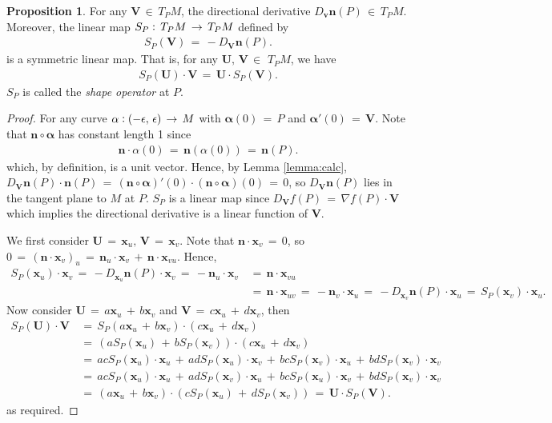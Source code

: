 \documentclass{UKZNcomp}
\newcommand{\vect}[1]{\mathbf{#1}} %
\theoremstyle{definition}
\newtheorem{prop}[definition]{Proposition}
\theoremstyle{remark}
\begin{document}
\begin{prop}
For any $ \vect{V}\,\in\,T_PM $, the directional derivative $D_{\vect{v}}\vect{n}(P)\,\in\,T_PM$. Moreover, the linear map $S_P\vcentcolon\,T_PM\,\to\,T_PM$ defined by
\begin{align*}
S_P(\vect{V})\,=\,-D_{\vect{V}}\vect{n}(P).
\end{align*}
is a symmetric linear map. That is, for any $\vect{U},\,\vect{V}\,\in\,\,T_PM$, we have
\begin{align*}
S_P(\vect{U})\cdot\vect{V}\,=\,\vect{U}\cdot S_P(\vect{V}).
\end{align*}
$S_P$ is called the \textit{shape operator} at $P$.
\end{prop}

\begin{proof}
For any curve $\vect{\alpha}\vcentcolon(-\epsilon,\,\epsilon)\,\to\,M$ with $\vect{\alpha}(0)\,=\,P$ and $\vect{\alpha}'(0)\,=\,\vect{V}$. Note that $\vect n\circ\vect{\alpha}$ has constant length 1 since
\begin{align*}
\vect n\cdot\alpha(0)\,=\,\vect{n}(\alpha(0))\,=\,\vect{n}(P).
\end{align*}
which, by definition, is a unit vector. Hence, by Lemma \ref{lemma:calc}, $D_\vect{V}\vect{n}(P)\cdot\vect{n}(P)\,=\,(\vect{n}\circ\vect{\alpha})'(0)\cdot(\vect{n}\circ\vect{\alpha})(0)\,=\,0$, so $D_\vect{V}\vect{n}(P)$ lies in the tangent plane to $M$ at $P$. $S_P$ is a linear map since $D_\vect V f(P)\,=\,\nabla f(P)\cdot\vect V$ which implies the directional derivative is a linear function of $\vect V$.

We first consider $\vect U\,=\,\vect{x}_u,\,\vect{V}\,=\,\vect{x}_v$. Note that $\vect{n}\cdot\vect{x}_v\,=\,0$, so $0\,=\,(\vect{n}\cdot\vect{x}_v)_u\,=\,\vect{n}_u\cdot\vect{x}_v\,+\,\vect{n}\cdot\vect{x}_{vu}$. Hence,
\begin{align*}
S_P(\vect x_u)\cdot\vect x_v\,=\,-D_{\vect{x}_u}\vect{n}(P)\cdot\vect x_v\,=\,-\vect{n}_u\cdot\vect{x}_v\,&=\,\vect{n}\cdot\vect{x}_{vu}\\
&=\,\vect{n}\cdot\vect{x}_{uv}\,=\,-\vect{n}_v\cdot\vect{x}_u\,=\,-D_{\vect{x}_v}\vect{n}(P)\cdot\vect x_u\,=\,S_P(\vect x_v)\cdot\vect x_u.
\end{align*}
Now consider $\vect{U}\,=\,a\vect x_u\,+\,b\vect x_v$ and $\vect{V}\,=\,c\vect x_u\,+\,d\vect x_v$, then
\begin{align*}
S_P(\vect{U})\cdot\vect V\,&=\,S_P(a\vect x_u\,+\,b\vect x_v)\cdot(c\vect x_u\,+\,d\vect x_v)\\
&=\,(aS_P(\vect x_u)\,+\,bS_P(\vect x_v))\cdot(c\vect x_u\,+\,d\vect x_v)\\
&=\,acS_P(\vect x_u)\cdot\vect x_u\,+\,adS_P(\vect x_u)\cdot\vect x_v\,+\,bcS_P(\vect x_v)\cdot\vect x_u\,+\,bdS_P(\vect x_v)\cdot\vect x_v\\
&=\,acS_P(\vect x_u)\cdot\vect x_u\,+\,adS_P(\vect x_v)\cdot\vect x_u\,+\,bcS_P(\vect x_u)\cdot\vect x_v\,+\,bdS_P(\vect x_v)\cdot\vect x_v\\
&=\,(a\vect x_u\,+\,b\vect x_v)\cdot(cS_P(\vect x_u)\,+\,dS_P(\vect x_v))\,=\,\vect U \cdot S_P(\vect V).
\end{align*}
as required.
\end{proof}
\end{document}
